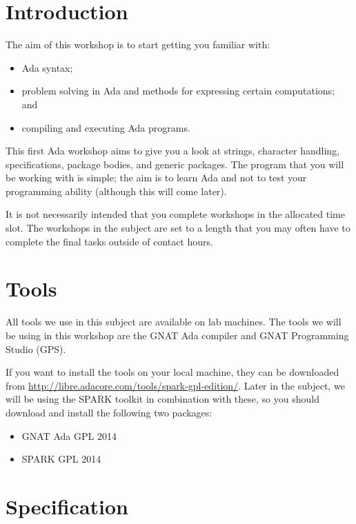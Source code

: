 \documentclass{article}
\begin{document}
%


\section*{Introduction}
\label{section:introduction}

The aim of this workshop is to start getting you familiar with:

\begin{itemize}
  \item Ada syntax;
  \item problem solving in Ada and methods for expressing certain
    computations; and
  \item compiling and executing Ada programs.
\end{itemize}

This first Ada workshop aims to give you a look at strings, character handling, specifications, package bodies, and generic packages. The program that you will be working with is simple; the aim is to learn Ada and not to test your programming ability (although this will come later).

It is not necessarily intended that you complete workshops in the allocated time slot. The workshops in the subject are set to a length that you may often have to complete the final tasks outside of contact hours.

\section*{Tools}

All tools we use in this subject are available on lab machines. The tools we will be using in this workshop are the GNAT Ada compiler and GNAT Programming Studio (GPS). 

If you want to install the tools on your local machine, they can be downloaded from  \url{http://libre.adacore.com/tools/spark-gpl-edition/}. Later in the subject, we will be using the SPARK toolkit in combination with these, so you should download and install the following two packages:

\begin{itemize}
 \item GNAT Ada GPL 2014
 \item SPARK GPL 2014
\end{itemize}

\section*{Specification}
\label{sec:spec}
\end{document}
